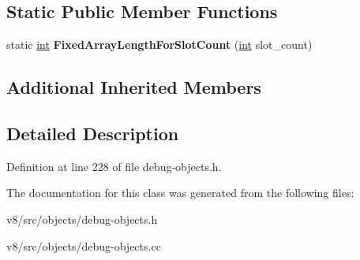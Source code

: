 \subsection*{Static Public Member Functions}
\begin{DoxyCompactItemize}
\item 
\mbox{\label{classv8_1_1internal_1_1CoverageInfo_aa54157dc9adba889637b3dbd72bd9cdf}} 
static \mbox{\hyperlink{classint}{int}} {\bfseries Fixed\+Array\+Length\+For\+Slot\+Count} (\mbox{\hyperlink{classint}{int}} slot\+\_\+count)
\end{DoxyCompactItemize}
\subsection*{Additional Inherited Members}


\subsection{Detailed Description}


Definition at line 228 of file debug-\/objects.\+h.



The documentation for this class was generated from the following files\+:\begin{DoxyCompactItemize}
\item 
v8/src/objects/debug-\/objects.\+h\item 
v8/src/objects/debug-\/objects.\+cc\end{DoxyCompactItemize}
